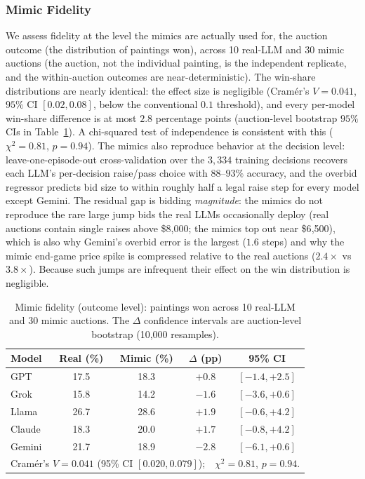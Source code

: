\documentclass[conference]{IEEEtran}
\begin{document}
\subsubsection{Mimic Fidelity}
\label{sec:fidelity-results}
We assess fidelity at the level the mimics are actually used for, the auction outcome (the distribution of paintings won), across 10 real-LLM and 30 mimic auctions (the auction, not the individual painting, is the independent replicate, and the within-auction outcomes are near-deterministic). The win-share distributions are nearly identical: the effect size is negligible (Cram\'er's $V = 0.041$, $95\%$ CI $[0.02, 0.08]$, below the conventional $0.1$ threshold), and every per-model win-share difference is at most $2.8$ percentage points (auction-level bootstrap $95\%$ CIs in Table~\ref{tab:mimic_fidelity}). A chi-squared test of independence is consistent with this ($\chi^2 = 0.81$, $p = 0.94$). The mimics also reproduce behavior at the decision level: leave-one-episode-out cross-validation over the $3{,}334$ training decisions recovers each LLM's per-decision raise/pass choice with $88$--$93\%$ accuracy, and the overbid regressor predicts bid size to within roughly half a legal raise step for every model except Gemini. The residual gap is bidding \emph{magnitude}: the mimics do not reproduce the rare large jump bids the real LLMs occasionally deploy (real auctions contain single raises above \$8{,}000; the mimics top out near \$6{,}500), which is also why Gemini's overbid error is the largest ($1.6$ steps) and why the mimic end-game price spike is compressed relative to the real auctions ($2.4\times$ vs $3.8\times$). Because such jumps are infrequent their effect on the win distribution is negligible.

\begin{table}[htbp]
\caption{Mimic fidelity (outcome level): paintings won across 10 real-LLM and 30 mimic auctions. The $\Delta$ confidence intervals are auction-level bootstrap (10{,}000 resamples).}
\label{tab:mimic_fidelity}
\centering
\begin{tabular}{lcccc}
\hline
Model & Real (\%) & Mimic (\%) & $\Delta$ (pp) & 95\% CI \\
\hline
GPT & 17.5 & 18.3 & $+0.8$ & $[-1.4, +2.5]$ \\
Grok    & 15.8 & 14.2 & $-1.6$ & $[-3.6, +0.6]$ \\
Llama   & 26.7 & 28.6 & $+1.9$ & $[-0.6, +4.2]$ \\
Claude  & 18.3 & 20.0 & $+1.7$ & $[-0.8, +4.2]$ \\
Gemini  & 21.7 & 18.9 & $-2.8$ & $[-6.1, +0.6]$ \\
\hline
\multicolumn{5}{l}{Cram\'er's $V = 0.041$ (95\% CI $[0.020, 0.079]$);\ \ $\chi^2 = 0.81$, $p = 0.94$.} \\
\hline
\end{tabular}
\end{table}
\end{document}
